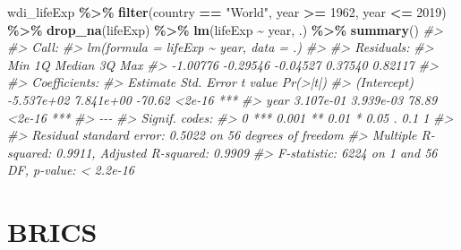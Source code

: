 \documentclass[
  xelatex, ja=standard]{bxjsbook}
\newenvironment{Shaded}{\begin{snugshade}}{\end{snugshade}}
\newcommand{\CommentTok}[1]{\textcolor[rgb]{0.56,0.35,0.01}{\textit{#1}}}
\newcommand{\DecValTok}[1]{\textcolor[rgb]{0.00,0.00,0.81}{#1}}
\newcommand{\FunctionTok}[1]{\textcolor[rgb]{0.13,0.29,0.53}{\textbf{#1}}}
\newcommand{\NormalTok}[1]{#1}
\newcommand{\SpecialCharTok}[1]{\textcolor[rgb]{0.81,0.36,0.00}{\textbf{#1}}}
\newcommand{\StringTok}[1]{\textcolor[rgb]{0.31,0.60,0.02}{#1}}
\theoremstyle{definition}
\theoremstyle{definition}
\theoremstyle{definition}
\theoremstyle{definition}
\theoremstyle{remark}
\begin{document}
\begin{Shaded}
\begin{Highlighting}[]
\NormalTok{wdi\_lifeExp }\SpecialCharTok{\%\textgreater{}\%} \FunctionTok{filter}\NormalTok{(country }\SpecialCharTok{==} \StringTok{"World"}\NormalTok{, year }\SpecialCharTok{\textgreater{}=} \DecValTok{1962}\NormalTok{, year }\SpecialCharTok{\textless{}=} \DecValTok{2019}\NormalTok{) }\SpecialCharTok{\%\textgreater{}\%} \FunctionTok{drop\_na}\NormalTok{(lifeExp) }\SpecialCharTok{\%\textgreater{}\%} \FunctionTok{lm}\NormalTok{(lifeExp }\SpecialCharTok{\textasciitilde{}}\NormalTok{ year, .) }\SpecialCharTok{\%\textgreater{}\%} \FunctionTok{summary}\NormalTok{()}
\CommentTok{\#\textgreater{} }
\CommentTok{\#\textgreater{} Call:}
\CommentTok{\#\textgreater{} lm(formula = lifeExp \textasciitilde{} year, data = .)}
\CommentTok{\#\textgreater{} }
\CommentTok{\#\textgreater{} Residuals:}
\CommentTok{\#\textgreater{}      Min       1Q   Median       3Q      Max }
\CommentTok{\#\textgreater{} {-}1.00776 {-}0.29546 {-}0.04527  0.37540  0.82117 }
\CommentTok{\#\textgreater{} }
\CommentTok{\#\textgreater{} Coefficients:}
\CommentTok{\#\textgreater{}               Estimate Std. Error t value Pr(\textgreater{}|t|)    }
\CommentTok{\#\textgreater{} (Intercept) {-}5.537e+02  7.841e+00  {-}70.62   \textless{}2e{-}16 ***}
\CommentTok{\#\textgreater{} year         3.107e{-}01  3.939e{-}03   78.89   \textless{}2e{-}16 ***}
\CommentTok{\#\textgreater{} {-}{-}{-}}
\CommentTok{\#\textgreater{} Signif. codes:  }
\CommentTok{\#\textgreater{} 0 \textquotesingle{}***\textquotesingle{} 0.001 \textquotesingle{}**\textquotesingle{} 0.01 \textquotesingle{}*\textquotesingle{} 0.05 \textquotesingle{}.\textquotesingle{} 0.1 \textquotesingle{} \textquotesingle{} 1}
\CommentTok{\#\textgreater{} }
\CommentTok{\#\textgreater{} Residual standard error: 0.5022 on 56 degrees of freedom}
\CommentTok{\#\textgreater{} Multiple R{-}squared:  0.9911, Adjusted R{-}squared:  0.9909 }
\CommentTok{\#\textgreater{} F{-}statistic:  6224 on 1 and 56 DF,  p{-}value: \textless{} 2.2e{-}16}
\end{Highlighting}
\end{Shaded}

\hypertarget{brics}{%
\section{BRICS}\label{brics}}
\end{document}
